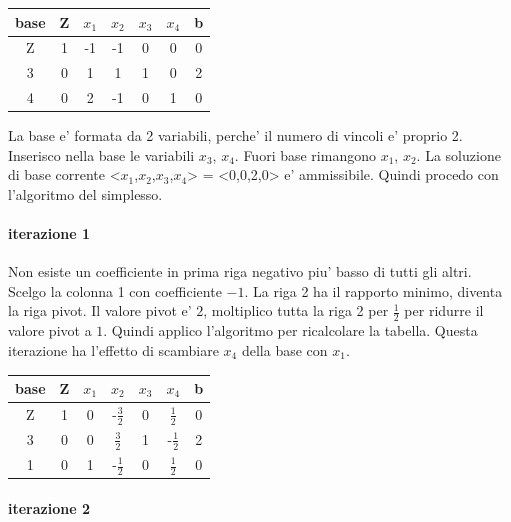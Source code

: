 \documentclass[a4paper,12pt,oneside]{article}
\begin{document}
    \begin{center}
        \begin{tabular}{|c|c|c|c|c|c|c|}
            \hline
            base & Z & $x_1$ & $x_2$ & $x_3$ & $x_4$ & b\\
            \hline
            Z & 1 & -1 & -1 & 0 & 0 & 0\\
            3 & 0 & 1 & 1 & 1 & 0 & 2\\
            4 & 0 & 2 & -1 & 0 & 1 & 0\\
            \hline
        \end{tabular}
    \end{center}

    La base e' formata da 2 variabili, perche' il numero di vincoli e' proprio 2.
    Inserisco nella base le variabili $x_3$, $x_4$. Fuori base rimangono $x_1$, $x_2$.
    La soluzione di base corrente <$x_1$,$x_2$,$x_3$,$x_4$> = <0,0,2,0> e' ammissibile. Quindi procedo con l'algoritmo del simplesso.

    \paragraph{iterazione 1}

    Non esiste un coefficiente in prima riga negativo piu' basso di tutti gli altri. Scelgo la colonna 1 con coefficiente $-1$.
    La riga 2 ha il rapporto minimo, diventa la riga pivot.
    Il valore pivot e' $2$, moltiplico tutta la riga 2 per $\frac 1 2$ per ridurre il valore pivot a $1$.
    Quindi applico l'algoritmo per ricalcolare la tabella.
    Questa iterazione ha l'effetto di scambiare $x_4$ della base con $x_1$.

    \begin{center}
        \begin{tabular}{|c|c|c|c|c|c|c|}
            \hline
            base & Z & $x_1$ & $x_2$ & $x_3$ & $x_4$ & b\\
            \hline
            Z & 1 & 0 & -$\frac 3 2$ & 0 & $\frac 1 2$ & 0\\
            3 & 0 & 0 & $\frac 3 2$ & 1 & -$\frac 1 2$ & 2\\
            1 & 0 & 1 & -$\frac 1 2$ & 0 & $\frac 1 2$ & 0\\
            \hline
        \end{tabular}
    \end{center}

    \paragraph{iterazione 2}
\end{document}
